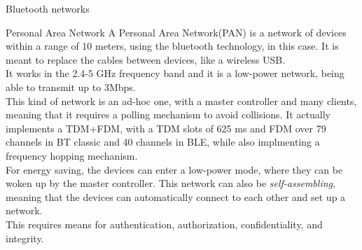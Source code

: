 \begin{section}{Bluetooth networks}
  \begin{subsection}{Personal Area Network}
    A Personal Area Network(PAN) is a network of devices within a range of 10 meters, using the bluetooth
    technology, in this case. It is meant to replace the cables between devices, like a wireless USB.\\
    It works in the 2.4-5 GHz frequency band and it is a low-power network, being able to transmit
    up to 3Mbps.\\
    This kind of network is an ad-hoc one, with a master controller and many clients, meaning that 
    it requires a polling mechanism to avoid collisions. It actually implements a TDM+FDM, with a 
    TDM slots of 625 ms and FDM over 79 channels in BT classic and 40 channels in BLE, while also 
    implmenting a frequency hopping mechanism.\\
    For energy saving, the devices can enter a low-power mode, where they can be woken up by the master
    controller. This network can also be \textit{self-assembling}, meaning that the devices can
    automatically connect to each other and set up a network.\\
    This requires means for authentication, authorization, confidentiality, and integrity.\\
  \end{subsection}
\end{section}

